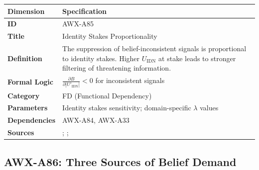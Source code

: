 \begin{table}[htbp]
\small
\begin{tabular}{p{3cm}p{11cm}}
\toprule
\textbf{Dimension} & \textbf{Specification} \\
\midrule
\textbf{ID} & AWX-A85 \\
\textbf{Title} & Identity Stakes Proportionality \\
\textbf{Definition} & The suppression of belief-inconsistent signals is proportional to identity stakes. Higher $U_{\text{IDN}}$ at stake leads to stronger filtering of threatening information. \\
\textbf{Formal Logic} & $\frac{\partial B}{\partial |U'_{\text{IDN}}|} < 0$ for inconsistent signals \\
\textbf{Category} & FD (Functional Dependency) \\
\textbf{Parameters} & Identity stakes sensitivity; domain-specific $\lambda$ values \\
\textbf{Dependencies} & AWX-A84, AWX-A33 \\
\textbf{Sources} & \citet{benabou2011identity}; \citet{akerlof2000identity}; \citet{sherman2000accepting} \\
\bottomrule
\end{tabular}
\end{table}


\subsection{AWX-A86: Three Sources of Belief Demand}

